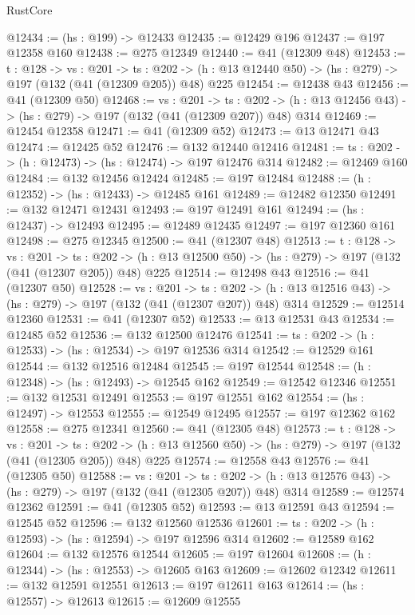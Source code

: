 \begin{lexlean}{RustCore}
\begin{coremodule}
@12434 := (hs : @199) -> @12433
@12435 := @12429 @196
@12437 := @197 @12358 @160
@12438 := @275 @12349
@12440 := @41 (@12309 @48)
@12453 := {t : @128} ->
  {vs : @201} ->
  {ts : @202} -> (h : @13 @12440 @50) -> (hs : @279) -> @197 (@132 (@41 (@12309 @205)) @48) @225
@12454 := @12438 @43
@12456 := @41 (@12309 @50)
@12468 := {vs : @201} ->
  {ts : @202} -> (h : @13 @12456 @43) -> (hs : @279) -> @197 (@132 (@41 (@12309 @207)) @48) @314
@12469 := @12454 @12358
@12471 := @41 (@12309 @52)
@12473 := @13 @12471 @43
@12474 := @12425 @52
@12476 := @132 @12440 @12416
@12481 := {ts : @202} -> (h : @12473) -> (hs : @12474) -> @197 @12476 @314
@12482 := @12469 @160
@12484 := @132 @12456 @12424
@12485 := @197 @12484
@12488 := (h : @12352) -> (hs : @12433) -> @12485 @161
@12489 := @12482 @12350
@12491 := @132 @12471 @12431
@12493 := @197 @12491 @161
@12494 := (hs : @12437) -> @12493
@12495 := @12489 @12435
@12497 := @197 @12360 @161
@12498 := @275 @12345
@12500 := @41 (@12307 @48)
@12513 := {t : @128} ->
  {vs : @201} ->
  {ts : @202} -> (h : @13 @12500 @50) -> (hs : @279) -> @197 (@132 (@41 (@12307 @205)) @48) @225
@12514 := @12498 @43
@12516 := @41 (@12307 @50)
@12528 := {vs : @201} ->
  {ts : @202} -> (h : @13 @12516 @43) -> (hs : @279) -> @197 (@132 (@41 (@12307 @207)) @48) @314
@12529 := @12514 @12360
@12531 := @41 (@12307 @52)
@12533 := @13 @12531 @43
@12534 := @12485 @52
@12536 := @132 @12500 @12476
@12541 := {ts : @202} -> (h : @12533) -> (hs : @12534) -> @197 @12536 @314
@12542 := @12529 @161
@12544 := @132 @12516 @12484
@12545 := @197 @12544
@12548 := (h : @12348) -> (hs : @12493) -> @12545 @162
@12549 := @12542 @12346
@12551 := @132 @12531 @12491
@12553 := @197 @12551 @162
@12554 := (hs : @12497) -> @12553
@12555 := @12549 @12495
@12557 := @197 @12362 @162
@12558 := @275 @12341
@12560 := @41 (@12305 @48)
@12573 := {t : @128} ->
  {vs : @201} ->
  {ts : @202} -> (h : @13 @12560 @50) -> (hs : @279) -> @197 (@132 (@41 (@12305 @205)) @48) @225
@12574 := @12558 @43
@12576 := @41 (@12305 @50)
@12588 := {vs : @201} ->
  {ts : @202} -> (h : @13 @12576 @43) -> (hs : @279) -> @197 (@132 (@41 (@12305 @207)) @48) @314
@12589 := @12574 @12362
@12591 := @41 (@12305 @52)
@12593 := @13 @12591 @43
@12594 := @12545 @52
@12596 := @132 @12560 @12536
@12601 := {ts : @202} -> (h : @12593) -> (hs : @12594) -> @197 @12596 @314
@12602 := @12589 @162
@12604 := @132 @12576 @12544
@12605 := @197 @12604
@12608 := (h : @12344) -> (hs : @12553) -> @12605 @163
@12609 := @12602 @12342
@12611 := @132 @12591 @12551
@12613 := @197 @12611 @163
@12614 := (hs : @12557) -> @12613
@12615 := @12609 @12555

\end{coremodule}
\end{lexlean}
